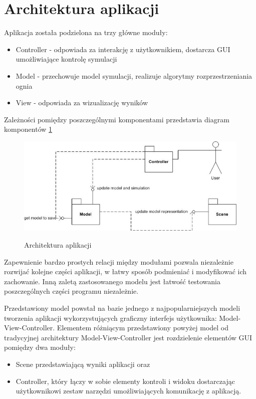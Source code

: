 \section {Architektura aplikacji}
Aplikacja została podzielona na trzy główne moduły:
\begin{itemize}
\item Controller - odpowiada za interakcję z użytkownikiem, dostarcza GUI umożliwiające kontrolę symulacji
\item Model - przechowuje model symulacji, realizuje algorytmy rozprzestrzeniania ognia
\item View - odpowiada za wizualizację wyników
\end{itemize}
Zależności pomiędzy poszczególnymi komponentami przedstawia diagram komponentów \ref{architektura aplikacji}
\begin{figure}
\begin {center}
\includegraphics{architectureComponentDiagram.jpg} \\
\caption { Architektura aplikacji}
\label {architektura aplikacji}
\end {center}
\end{figure}
Zapewnienie bardzo prostych relacji między modułami pozwala niezależnie rozwijać kolejne części aplikacji, w łatwy
sposób podmieniać i modyfikować ich zachowanie. Inną zaletą zastosowanego modelu jest łatwość
testowania poszczególnych części programu niezależnie.

Przedstawiony model powstał na bazie jednego z najpopularniejszych modeli tworzenia aplikacji wykorzystujących graficzny interfejs użytkownika: Model-View-Controller. Elementem różniącym przedstawiony powyżej model od tradycyjnej architektury Model-View-Controller
jest rozdzielenie elementów GUI pomiędzy dwa moduły:
\begin{itemize}
\item Scene przedstawiającą wyniki aplikacji oraz
\item Controller, który łączy w sobie elementy kontroli i widoku dostarczając użytkownikowi zestaw narzędzi umożliwiających komunikację z aplikacją.
\end {itemize}
